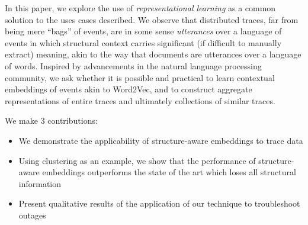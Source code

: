 In this paper, we explore the use of \emph{representational learning} as a common solution to the uses cases described.  We observe that distributed traces, far from being mere ``bags'' of events, are in some sense \emph{utterances} over a language of events in which structural context carries significant (if difficult to manually extract) meaning, akin to the way that documents are utterances over a language of words. Inspired by advancements in the natural language processing community, we ask whether it is possible and practical to learn contextual embeddings of events akin to Word2Vec, and to construct aggregate representations of entire traces and ultimately collections of similar traces.

We make 3 contributions: \newline
\begin{itemize}
\item We demonstrate the applicability of structure-aware embeddings to trace data 
\item Using clustering as an example, we show that the performance of structure-aware embeddings outperforms the state of the art which loses all  structural information
\item Present qualitative results of the application of our technique to troubleshoot outages
\end{itemize}


























